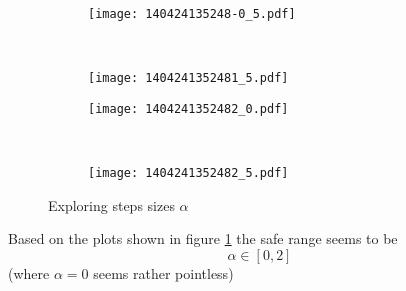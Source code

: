 \begin{figure}
	\begin{subfigure}[ht]{0.49\textwidth}
	\texttt{[image: 140424135248-0\_5.pdf]}
	\end{subfigure}
	~
	\begin{subfigure}[ht]{0.49\textwidth}
	\texttt{[image: 1404241352481\_5.pdf]}
	\end{subfigure} 

	\begin{subfigure}[ht]{0.49\textwidth}
	\texttt{[image: 1404241352482\_0.pdf]}
	\end{subfigure}
	~
	\begin{subfigure}[ht]{0.49\textwidth}
	\texttt{[image: 1404241352482\_5.pdf]}
	\end{subfigure} 
\caption{Exploring steps sizes $\alpha$}
\label{fig:140424135248}
\end{figure}
Based on the plots shown in figure \ref{fig:140424135248} the safe range seems to be 
$$\alpha \in \left[0, 2 \right]$$
(where $\alpha = 0$ seems rather pointless)


